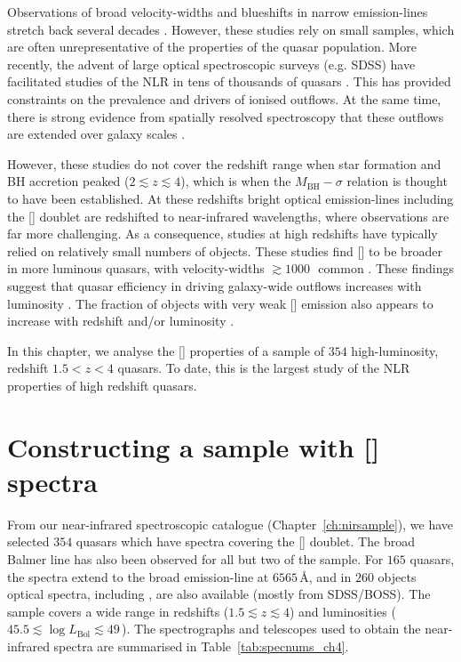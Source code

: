 Observations of broad velocity-widths and blueshifts in narrow emission-lines stretch back several decades \citep[e.g.][]{weedman70,stockton76,heckman81,veron81,feldman82,heckman84,vrtilek85,whittle85,boroson92}. 
However, these studies rely on small samples, which are often unrepresentative of the properties of the quasar population. 
More recently, the advent of large optical spectroscopic surveys (e.g. SDSS) have facilitated studies of the NLR in tens of thousands of quasars \citep[e.g.][]{boroson05,greene05a,zhang11,mullaney13,zakamska14,shen14}. 
This has provided constraints on the prevalence and drivers of ionised outflows.   
At the same time, there is strong evidence from spatially resolved spectroscopy that these outflows are extended over galaxy scales \citep[e.g.][]{greene09,greene11,harrison12,hainline13,harrison14}. 

However, these studies do not cover the redshift range when star formation and BH accretion peaked ($2 \lesssim z \lesssim 4$), which is when the $M_{\text{BH}}-\sigma$ relation is thought to have been established. 
At these redshifts bright optical emission-lines including the [] doublet are redshifted to near-infrared wavelengths, where observations are far more challenging. 
As a consequence, studies at high redshifts have typically relied on relatively small numbers of objects.
These studies find [] to be broader in more luminous quasars, with velocity-widths $\gtrsim1000$\,\kms\, common \citep[e.g.][]{netzer04,kim13,brusa15,shen16a}.  
These findings suggest that quasar efficiency in driving galaxy-wide outflows increases with luminosity \citep[e.g.][]{netzer04,nesvadba08,kim13,brusa15,carniani15,perna15,bischetti16}. 
The fraction of objects with very weak [] emission also appears to increase with redshift and/or luminosity \citep[e.g.][]{netzer04}. 

In this chapter, we analyse the [] properties of a sample of $354$ high-luminosity, redshift $1.5 < z < 4$ quasars.
To date, this is the largest study of the NLR properties of high redshift quasars. 

\section[Sample construction]{Constructing a sample with [] spectra}

From our near-infrared spectroscopic catalogue (Chapter~\ref{ch:nirsample}), we have selected $354$ quasars which have spectra covering the [] doublet. 
The broad Balmer \hb line has also been observed for all but two of the sample. 
For $165$ quasars, the spectra extend to the broad \ha emission-line at $6565$\,\AA, and in $260$ objects optical spectra, including , are also available (mostly from SDSS/BOSS). 
The sample covers a wide range in redshifts ($1.5 \lesssim z \lesssim 4$) and luminosities ($45.5 \lesssim \log L_{\text{Bol}} \lesssim 49$\,\ergs). 
The spectrographs and telescopes used to obtain the near-infrared spectra are summarised in Table~\ref{tab:specnums_ch4}.

